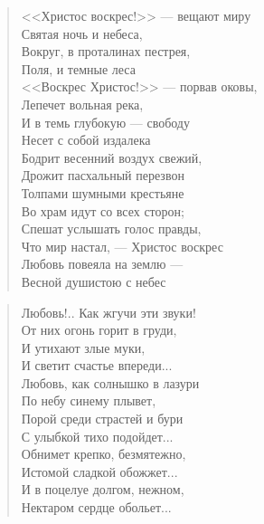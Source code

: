 \begin{verse}
\begin{altverse}
<<Христос воскрес!>> --- вещают миру\\
	Святая ночь и небеса,\\
Вокруг, в проталинах пестрея,\\
    Поля, и темные леса\ldotst\\
<<Воскрес Христос!>> --- порвав оковы,\\
    Лепечет вольная река,\\
И в темь глубокую --- свободу\\
    Несет с собой издалека\ldotst\\
Бодрит весенний воздух свежий,\\
    Дрожит пасхальный перезвон\ldotst\\
Толпами шумными крестьяне\\
    Во храм идут со всех сторон;\\
Спешат услышать голос правды,\\
    Что мир настал, --- Христос воскрес\ldotst\\
Любовь повеяла на землю ---\\
    Весной душистою с небес\ldotst\\
\end{altverse}
\end{verse}


\newpage
\vspace*{0cm}


\begin{verse}
\begin{altverse}
Любовь!.. Как жгучи эти звуки!\\
    От них огонь горит в груди,\\
И утихают злые муки,\\
    И светит счастье впереди...\\
Любовь, как солнышко в лазури\\
    По небу синему плывет,\\
Порой среди страстей и бури\\
    С улыбкой тихо подойдет...\\
Обнимет крепко, безмятежно,\\
    Истомой сладкой обожжет...\\
И в поцелуе долгом, нежном,\\
    Нектаром сердце обольет...\\
\end{altverse}
\end{verse}

